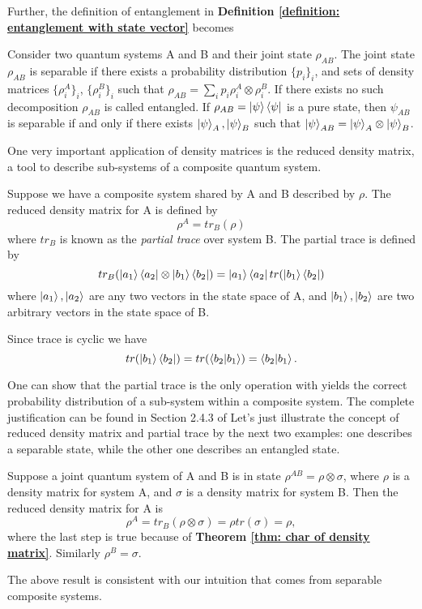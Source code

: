 Further, the definition of entanglement in \textbf{Definition \ref{definition: entanglement with state vector}} becomes 
\begin{definition}[Entanglement] \label{def: entanglement with density matrix}
 Consider two quantum systems A and B and their joint state $\rho_{AB}$. The joint state $\rho_{AB}$ is separable if there exists a probability distribution $\{p_i\}_i$, and sets of density matrices $\{\rho_i^A\}_i$, $\{\rho_i^B\}_i$ such that $\rho_{AB}=\sum_i p_i\rho_i^A\otimes\rho_i^B$.
 If there exists no such decomposition $\rho_{AB}$ is called entangled.
 If $\rho_{AB}=\ket{\psi}\bra{\psi}$ is a pure state, then $\psi_{AB}$ is separable if and only if there exists $\ket{\psi}_A, \ket{\psi}_B$ such that $\ket{\psi}_{AB}=\ket{\psi}_A \otimes \ket{\psi}_B$.
\end{definition}

One very important application of density matrices is the reduced density matrix, a tool to describe sub-systems of a composite quantum system.
\begin{definition}
 Suppose we have a composite system shared by A and B described by $\rho$. The reduced density matrix for A is defined by
\begin{equation}
    \rho^A=tr_B (\rho)
\end{equation}
where $tr_B$ is known as the \textit{partial trace} over system B. The partial trace is defined by
\begin{equation}
tr_B(\ket{a_1}\bra{a_2} \otimes \ket{b_1} \bra{b_2})=\ket{a_1}\bra{a_2}tr(\ket{b_1}\bra{b_2})
\end{equation}
where $\ket{a_1}, \ket{a_2}$ are any two vectors in the state space of A, and $\ket{b_1}, \ket{b_2}$ are two arbitrary vectors in the state space of B.
\end{definition}


Since trace is cyclic we have
\begin{equation}
 tr(\ket{b_1}\bra{b_2})=tr(\braket{b_2|b_1})=\braket{b_2|b_1}.
\end{equation}

One can show that the partial trace is the only operation with yields the correct probability distribution of a sub-system within a composite system. The complete justification can be found in Section 2.4.3 of \cite{Nielsen} 
Let's just illustrate the concept of reduced density matrix and partial trace by the next two examples: one describes a separable state, while the other one describes an entangled state.
\begin{example}
Suppose a joint quantum system of A and B is in state $\rho^{AB}=\rho \otimes \sigma$, where $\rho$ is a density matrix for system A, and $\sigma$ is a density matrix for system B. Then the reduced density matrix for A is
\begin{equation}
    \rho^A=tr_B (\rho \otimes \sigma)=\rho tr(\sigma)=\rho,
\end{equation}
where the last step is true because of \textbf{Theorem \ref{thm: char of density matrix}}.
Similarly $\rho^B=\sigma$.
\end{example}
The above result is consistent with our intuition that comes from separable composite systems.

